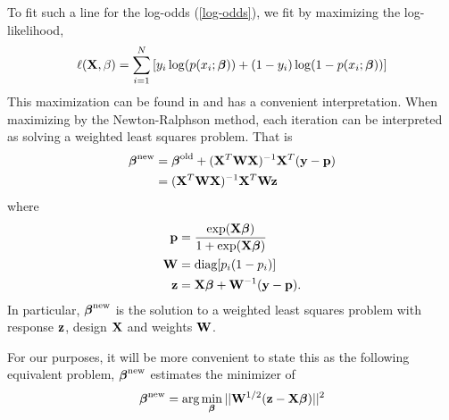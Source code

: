 \documentclass[main.tex]{subfiles}
\begin{document}
To fit such a line for the log-odds (\ref{log-odds}), we fit by maximizing the log-likelihood,
\begin{align}
	\ell(\mathbf{X}, \beta) = \sum_{i = 1}^N \left [ y_i \log (p(x_i; \boldsymbol \beta)) + (1-y_i) \log(1 - p(x_i; \boldsymbol \beta))\right ] \label{loglikelihood}
\end{align}
This maximization can be found in \cite{elemstatlearn} and has a convenient interpretation. When maximizing by the Newton-Ralphson method, each iteration can be interpreted as solving a weighted least squares problem. That is
\begin{align}
    \boldsymbol \beta^{\text{new}} &= \boldsymbol \beta^{\text{old}} + (\mathbf{X}^T \mathbf{W} \mathbf{X})^{-1} \mathbf{X}^T(\mathbf{y} - \mathbf{p}) \\
    &= (\mathbf{X}^T \mathbf{W} \mathbf{X})^{-1} \mathbf{X}^T \mathbf{W} \mathbf{z}
\end{align}
where
\begin{align}
	\mathbf{p} &= \dfrac{\text{exp}(\mathbf{X} \boldsymbol \beta)}{1 + \text{exp}(\mathbf{X} \boldsymbol \beta)} \label{pdef}\\
    \mathbf{W} &= \text{diag}[p_i(1-p_i)] \label{Wdef}\\
    \mathbf{z} &= \mathbf{X} \boldsymbol \beta + \mathbf{W}^{-1}(\mathbf{y} - \mathbf{p}). \label{zdef}
\end{align}
In particular, $\boldsymbol \beta^{\text{new}}$ is the solution to a weighted least squares problem with response $\mathbf{z}$, design $\mathbf{X}$ and weights $\mathbf{W}$.

For our purposes, it will be more convenient to state this as the following equivalent problem,  $\boldsymbol \beta^{\text{new}}$ estimates the minimizer of
\begin{align}
    \boldsymbol \beta^{\text{new}} =  \text{arg} \min_{\boldsymbol \beta} ||\mathbf{W}^{1/2}(\mathbf{z} - \mathbf{X} \boldsymbol \beta)||^2
\end{align}
\end{document}
